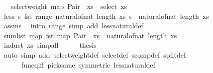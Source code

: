\begin{isabellebody}
\ \ \ {\isachardoublequoteopen}select{\isacharunderscore}{\kern0pt}weight\ {\isacharparenleft}{\kern0pt}map\ {\isacharparenleft}{\kern0pt}Pair\ {}{\isacharparenright}{\kern0pt}\ xs{\isacharparenright}{\kern0pt}\ {\isacharequal}{\kern0pt}\ select\ xs{\isachardoublequoteclose}\isanewline
%
\isadelimproof
%
\endisadelimproof
%
\isatagproof
{}\isamarkupfalse%
\ {\isacharminus}{\kern0pt}\isanewline
\ \ \isamarkupfalse%
\ less{\isacharcolon}{\kern0pt}\ {\isachardoublequoteopen}{\isasymAnd}s{\isachardot}{\kern0pt}\ fst\ {\isacharparenleft}{\kern0pt}range\ {\isacharparenleft}{\kern0pt}natural{\isacharunderscore}{\kern0pt}of{\isacharunderscore}{\kern0pt}nat\ {\isacharparenleft}{\kern0pt}length\ xs{\isacharparenright}{\kern0pt}{\isacharparenright}{\kern0pt}\ s{\isacharparenright}{\kern0pt}\ {\isacharless}{\kern0pt}\ natural{\isacharunderscore}{\kern0pt}of{\isacharunderscore}{\kern0pt}nat\ {\isacharparenleft}{\kern0pt}length\ xs{\isacharparenright}{\kern0pt}{\isachardoublequoteclose}\isanewline
\ \ \ \ \isamarkupfalse%
\ assms\ \isamarkupfalse%
\ {\isacharparenleft}{\kern0pt}intro\ range{\isacharparenright}{\kern0pt}\ {\isacharparenleft}{\kern0pt}simp\ add{\isacharcolon}{\kern0pt}\ less{\isacharunderscore}{\kern0pt}natural{\isacharunderscore}{\kern0pt}def{\isacharparenright}{\kern0pt}\isanewline
\ \ \isamarkupfalse%
\ \isamarkupfalse%
\ {\isachardoublequoteopen}sum{\isacharunderscore}{\kern0pt}list\ {\isacharparenleft}{\kern0pt}map\ fst\ {\isacharparenleft}{\kern0pt}map\ {\isacharparenleft}{\kern0pt}Pair\ {}{\isacharparenright}{\kern0pt}\ xs{\isacharparenright}{\kern0pt}{\isacharparenright}{\kern0pt}\ {\isacharequal}{\kern0pt}\ natural{\isacharunderscore}{\kern0pt}of{\isacharunderscore}{\kern0pt}nat\ {\isacharparenleft}{\kern0pt}length\ xs{\isacharparenright}{\kern0pt}{\isachardoublequoteclose}\isanewline
\ \ \ \ \isamarkupfalse%
\ {\isacharparenleft}{\kern0pt}induct\ xs{\isacharparenright}{\kern0pt}\ simp{\isacharunderscore}{\kern0pt}all\isanewline
\ \ \isamarkupfalse%
\ \isamarkupfalse%
\ {\isacharquery}{\kern0pt}thesis\isanewline
\ \ \ \ \isamarkupfalse%
\ {\isacharparenleft}{\kern0pt}auto\ simp\ add{\isacharcolon}{\kern0pt}\ select{\isacharunderscore}{\kern0pt}weight{\isacharunderscore}{\kern0pt}def\ select{\isacharunderscore}{\kern0pt}def\ scomp{\isacharunderscore}{\kern0pt}def\ split{\isacharunderscore}{\kern0pt}def\isanewline
\ \ \ \ \ \ fun{\isacharunderscore}{\kern0pt}eq{\isacharunderscore}{\kern0pt}iff\ pick{\isacharunderscore}{\kern0pt}same\ {\isacharbrackleft}{\kern0pt}symmetric{\isacharbrackright}{\kern0pt}\ less{\isacharunderscore}{\kern0pt}natural{\isacharunderscore}{\kern0pt}def{\isacharparenright}{\kern0pt}\isanewline

\end{isabellebody}
